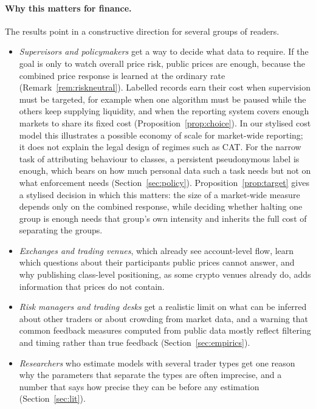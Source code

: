 \documentclass[12pt]{article}
\theoremstyle{definition}
\theoremstyle{remark}
\begin{document}
\paragraph{Why this matters for finance.} The results point in a constructive direction for several groups of readers.
\begin{itemize}[itemsep=1pt]
\item \emph{Supervisors and policymakers} get a way to decide what data to require. If the goal is only to watch overall price risk, public prices are enough, because the combined price response is learned at the ordinary rate (Remark~\ref{rem:riskneutral}). Labelled records earn their cost when supervision must be targeted, for example when one algorithm must be paused while the others keep supplying liquidity, and when the reporting system covers enough markets to share its fixed cost (Proposition~\ref{prop:choice}). In our stylised cost model this illustrates a possible economy of scale for market-wide reporting; it does not explain the legal design of regimes such as CAT. For the narrow task of attributing behaviour to classes, a persistent pseudonymous label is enough, which bears on how much personal data such a task needs but not on what enforcement needs (Section~\ref{sec:policy}). Proposition~\ref{prop:target} gives a stylised decision in which this matters: the size of a market-wide measure depends only on the combined response, while deciding whether halting one group is enough needs that group's own intensity and inherits the full cost of separating the groups.
\item \emph{Exchanges and trading venues}, which already see account-level flow, learn which questions about their participants public prices cannot answer, and why publishing class-level positioning, as some crypto venues already do, adds information that prices do not contain.
\item \emph{Risk managers and trading desks} get a realistic limit on what can be inferred about other traders or about crowding from market data, and a warning that common feedback measures computed from public data mostly reflect filtering and timing rather than true feedback (Section~\ref{sec:empirics}).
\item \emph{Researchers} who estimate models with several trader types get one reason why the parameters that separate the types are often imprecise, and a number that says how precise they can be before any estimation (Section~\ref{sec:lit}).
\end{itemize}
\end{document}
